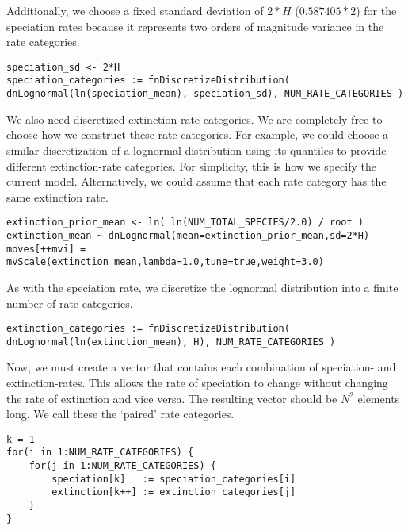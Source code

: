Additionally, we choose a fixed standard deviation of $2*H$ ($0.587405*2$) for the speciation rates because it represents two orders of magnitude variance in the rate categories.
{\tt \begin{snugshade*}
\begin{lstlisting}
speciation_sd <- 2*H
speciation_categories := fnDiscretizeDistribution( dnLognormal(ln(speciation_mean), speciation_sd), NUM_RATE_CATEGORIES )
\end{lstlisting}
\end{snugshade*}}

We also need discretized extinction-rate categories.
We are completely free to choose how we construct these rate categories.
For example, we could choose a similar discretization of a lognormal distribution using its quantiles to provide different extinction-rate categories.
For simplicity, this is how we specify the current model.
Alternatively, we could assume that each rate category has the same extinction rate.

{\tt \begin{snugshade*}
\begin{lstlisting}
extinction_prior_mean <- ln( ln(NUM_TOTAL_SPECIES/2.0) / root )
extinction_mean ~ dnLognormal(mean=extinction_prior_mean,sd=2*H)
moves[++mvi] = mvScale(extinction_mean,lambda=1.0,tune=true,weight=3.0)
\end{lstlisting}
\end{snugshade*}}
As with the speciation rate, we discretize the lognormal distribution into a finite number of rate categories.
{\tt \begin{snugshade*}
\begin{lstlisting}
extinction_categories := fnDiscretizeDistribution( dnLognormal(ln(extinction_mean), H), NUM_RATE_CATEGORIES )
\end{lstlisting}
\end{snugshade*}}

Now, we must create a vector that contains each combination of speciation- and extinction-rates.
This allows the rate of speciation to change without changing the rate of extinction and vice versa.
The resulting vector should be $N^2$ elements long.
We call these the `paired' rate categories.

{\tt \begin{snugshade*}
\begin{lstlisting}
k = 1
for(i in 1:NUM_RATE_CATEGORIES) {
    for(j in 1:NUM_RATE_CATEGORIES) {
        speciation[k]   := speciation_categories[i]
        extinction[k++] := extinction_categories[j]
    }
}
\end{lstlisting}
\end{snugshade*}}

